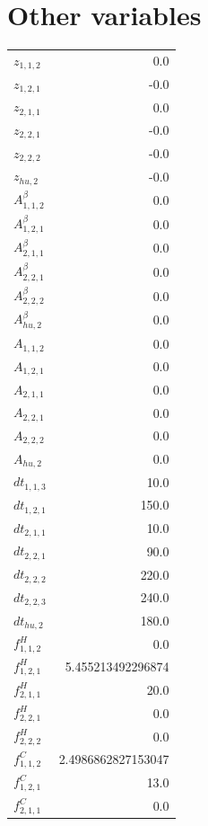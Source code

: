 \documentclass{article}%
\makeatletter
\let\mcnewpage=\newpage%
\newcommand{\TrickSupertabularIntoMulticols}{%
\renewcommand\newpage{%
\if@firstcolumn%
\hrule width\linewidth height0pt%
\columnbreak%
\else%
\mcnewpage%
\fi%
}%
}%
\makeatother
\begin{document}
\section{Other variables}%
\thispagestyle{plain}%
\begin{multicols*}{3}%
\TrickSupertabularIntoMulticols%
%
\begin{supertabular}{lr}%
	$z_{1,1,2}$ & 0.0 \\%
	$z_{1,2,1}$ & -0.0 \\%
	$z_{2,1,1}$ & 0.0 \\%
	$z_{2,2,1}$ & -0.0 \\%
	$z_{2,2,2}$ & -0.0 \\%
	$z_{hu,2}$ & -0.0 \\%
	$A_{1,1,2}^{\beta}$ & 0.0 \\%
	$A_{1,2,1}^{\beta}$ & 0.0 \\%
	$A_{2,1,1}^{\beta}$ & 0.0 \\%
	$A_{2,2,1}^{\beta}$ & 0.0 \\%
	$A_{2,2,2}^{\beta}$ & 0.0 \\%
	$A_{hu,2}^{\beta}$ & 0.0 \\%
	$A_{1,1,2}$ & 0.0 \\%
	$A_{1,2,1}$ & 0.0 \\%
	$A_{2,1,1}$ & 0.0 \\%
	$A_{2,2,1}$ & 0.0 \\%
	$A_{2,2,2}$ & 0.0 \\%
	$A_{hu,2}$ & 0.0 \\%
	$dt_{1,1,3}$ & 10.0 \\%
	$dt_{1,2,1}$ & 150.0 \\%
	$dt_{2,1,1}$ & 10.0 \\%
	$dt_{2,2,1}$ & 90.0 \\%
	$dt_{2,2,2}$ & 220.0 \\%
	$dt_{2,2,3}$ & 240.0 \\%
	$dt_{hu,2}$ & 180.0 \\%
	$f_{1,1,2}^{H}$ & 0.0 \\%
	$f_{1,2,1}^{H}$ & 5.455213492296874 \\%
	$f_{2,1,1}^{H}$ & 20.0 \\%
	$f_{2,2,1}^{H}$ & 0.0 \\%
	$f_{2,2,2}^{H}$ & 0.0 \\%
	$f_{1,1,2}^{C}$ & 2.4986862827153047 \\%
	$f_{1,2,1}^{C}$ & 13.0 \\%
	$f_{2,1,1}^{C}$ & 0.0 \\%

\end{supertabular}
\end{multicols*}
\end{document}
